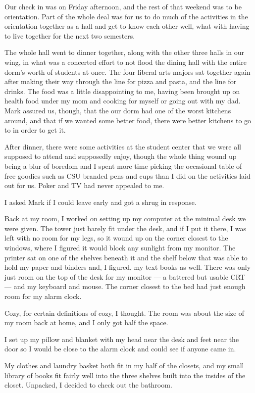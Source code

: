 Our check in was on Friday afternoon, and the rest of that weekend was to be orientation.  Part of the whole deal was for us to do much of the activities in the orientation together as a hall and get to know each other well, what with having to live together for the next two semesters.

The whole hall went to dinner together, along with the other three halls in our wing, in what was a concerted effort to not flood the dining hall with the entire dorm's worth of students at once.  The four liberal arts majors sat together again after making their way through the line for pizza and pasta, and the line for drinks.  The food was a little disappointing to me, having been brought up on health food under my mom and cooking for myself or going out with my dad.  Mark assured us, though, that the our dorm had one of the worst kitchens around, and that if we wanted some better food, there were better kitchens to go to in order to get it.

After dinner, there were some activities at the student center that we were all supposed to attend and supposedly enjoy, though the whole thing wound up being a blur of boredom and I spent more time picking the occasional table of free goodies such as CSU branded pens and cups than I did on the activities laid out for us.  Poker and TV had never appealed to me.

I asked Mark if I could leave early and got a shrug in response.

Back at my room, I worked on setting up my computer at the minimal desk we were given.  The tower just barely fit under the desk, and if I put it there, I was left with no room for my legs, so it wound up on the corner closest to the windows, where I figured it would block any sunlight from my monitor.  The printer sat on one of the shelves beneath it and the shelf below that was able to hold my paper and binders and, I figured, my text books as well.  There was only just room on the top of the desk for my monitor --- a battered but usable CRT --- and my keyboard and mouse.  The corner closest to the bed had just enough room for my alarm clock.

Cozy, for certain definitions of cozy, I thought.  The room was about the size of my room back at home, and I only got half the space.

I set up my pillow and blanket with my head near the desk and feet near the door so I would be close to the alarm clock and could see if anyone came in.

My clothes and laundry basket both fit in my half of the closets, and my small library of books fit fairly well into the three shelves built into the insides of the closet.  Unpacked, I decided to check out the bathroom.

